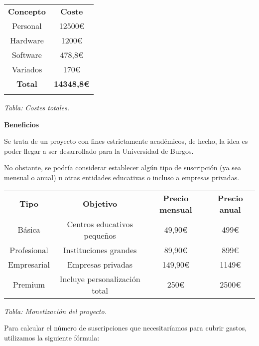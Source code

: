 \begin{center}
    \begin{tabular}{| c | c |}\hline
    \Xhline{2\arrayrulewidth}
    \textbf{Concepto} & \textbf{Coste} \\ \Xhline{2\arrayrulewidth}
    Personal & 12500€ \\ \hline
    Hardware & 1200€\\ \hline
    Software & 478,8€ \\ \hline
    Variados & 170€ \\ \hline
    \Xhline{2\arrayrulewidth}
    \textbf{Total} & \textbf{14348,8€} \\ \Xhline{2\arrayrulewidth}
    \end{tabular}


    \vspace{0.3em}
    \textit{Tabla: Costes totales.}
\end{center}

\textbf{Beneficios}

Se trata de un proyecto con fines estrictamente académicos, de hecho, la idea es poder llegar a ser desarrollado para
la Universidad de Burgos.

No obstante, se podría considerar establecer algún tipo de suscripción (ya sea mensual o anual) u otras entidades educativas
o incluso a empresas privadas.

\begin{center}
    \begin{tabular}{| c | c | c | c | }\hline
    \Xhline{2\arrayrulewidth}
    \textbf{Tipo} & \textbf{Objetivo} & \textbf{Precio mensual} & \textbf{Precio anual} \\ \Xhline{2\arrayrulewidth}
    Básica & Centros educativos pequeños & 49,90€ & 499€ \\ \hline
    Profesional & Instituciones grandes & 89,90€ & 899€ \\ \hline
    Empresarial & Empresas privadas & 149,90€ & 1149€ \\ \hline
    Premium & Incluye personalización total & 250€ & 2500€ \\ \hline
    \end{tabular}


    \vspace{0.3em}
    \textit{Tabla: Monetización del proyecto.}
\end{center}

Para calcular el número de suscripciones que necesitaríamos para cubrir gastos, utilizamos la siguiente fórmula:

